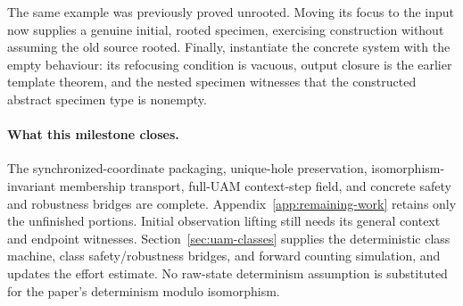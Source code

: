 






The same example was previously proved unrooted. Moving its focus to the input
now supplies a genuine initial, rooted specimen, exercising construction
without assuming the old source rooted. Finally, instantiate the concrete
system with the empty behaviour: its refocusing condition is vacuous, output
closure is the earlier template theorem, and the nested specimen witnesses
that the constructed abstract specimen type is nonempty.




\paragraph{What this milestone closes.}
The synchronized-coordinate packaging, unique-hole preservation,
isomorphism-invariant membership transport, full-UAM context-step field, and
concrete safety and robustness bridges are complete. Appendix~\ref{app:remaining-work}
retains only the unfinished portions. Initial observation lifting still needs its general context and endpoint
witnesses. Section~\ref{sec:uam-classes} supplies the deterministic class machine,
class safety/robustness bridges, and forward counting simulation, and updates
the effort estimate. No raw-state determinism assumption is substituted for
the paper's determinism modulo isomorphism.
